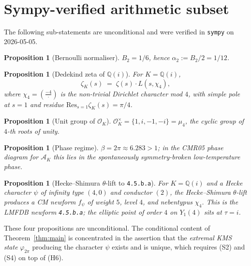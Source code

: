 \documentclass[12pt]{amsart}
\newtheorem{proposition}[theorem]{Proposition}
\theoremstyle{definition}
\newcommand{\Q}{\mathbb{Q}}
\newcommand{\OK}{\mathcal{O}_K}
\newcommand{\lmfdb}[1]{\texttt{#1}}
\begin{document}
\section{Sympy-verified arithmetic subset}
\label{sec:rigorous}

The following sub-statements are unconditional and were verified
in \texttt{sympy} on 2026-05-05.

\begin{proposition}[Bernoulli normaliser]
\label{prop:bernoulli}
$B_2 = 1/6$, hence $\alpha_2 := B_2 / 2 = 1/12$.
\end{proposition}

\begin{proposition}[Dedekind zeta of $\Q(i)$]
\label{prop:zetaK}
For $K = \Q(i)$,
\[
  \zeta_K(s) \;=\; \zeta(s) \cdot L(s, \chi_4),
\]
where $\chi_4 = \left(\tfrac{-4}{\,\cdot\,}\right)$ is the
non-trivial Dirichlet character mod $4$, with simple pole at
$s = 1$ and residue $\mathrm{Res}_{s=1} \zeta_K(s) = \pi / 4$.
\end{proposition}

\begin{proposition}[Unit group of $\OK$]
\label{prop:units}
$\OK^\times = \{1, i, -1, -i\} = \mu_4$, the cyclic group of $4$-th
roots of unity.
\end{proposition}

\begin{proposition}[Phase regime]
\label{prop:phase}
$\beta = 2\pi \approx 6.283 > 1$; in the CMR05 phase diagram for
$\mathcal{A}_K$ this lies in the spontaneously
symmetry-broken low-temperature phase.
\end{proposition}

\begin{proposition}[Hecke--Shimura $\theta$-lift to
                    \lmfdb{4.5.b.a}]
\label{prop:thetalift}
For $K = \Q(i)$ and a Hecke character $\psi$ of infinity type
$(4,0)$ and conductor $(2)$, the Hecke--Shimura $\theta$-lift
\cite{Hecke1937,Shimura1971} produces a CM newform $f_\psi$ of
weight $5$, level $4$, and nebentypus $\chi_4$. This is the LMFDB
newform \lmfdb{4.5.b.a}; the elliptic point of order $4$ on $Y_1(4)$
sits at $\tau = i$.
\end{proposition}

These four propositions are unconditional. The conditional content
of Theorem~\ref{thm:main} is concentrated in the assertion that the
\emph{extremal KMS state} $\varphi_{2\pi}$ producing the character
$\psi$ exists and is unique, which requires (S2) and (S4) on top
of (H6).
\end{document}
